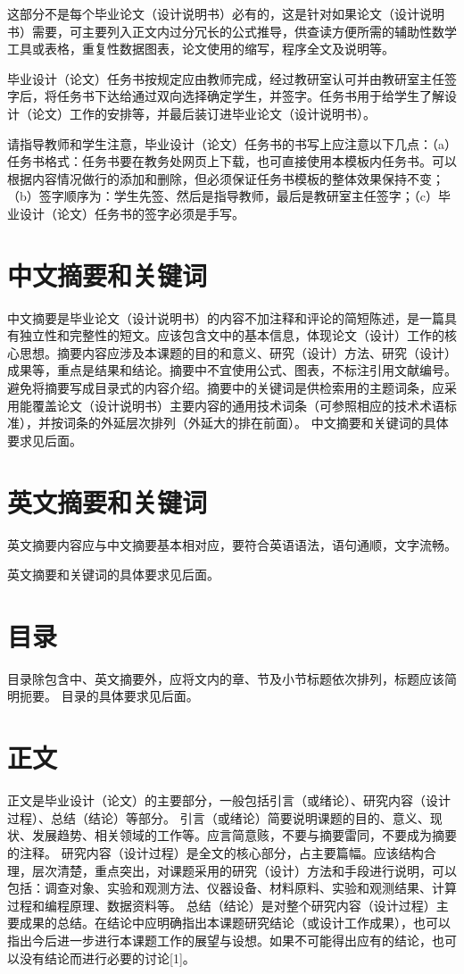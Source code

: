 这部分不是每个毕业论文（设计说明书）必有的，这是针对如果论文（设计说明书）需要，可主要列入正文内过分冗长的公式推导，供查读方便所需的辅助性数学工具或表格，重复性数据图表，论文使用的缩写，程序全文及说明等。

毕业设计（论文）任务书按规定应由教师完成，经过教研室认可并由教研室主任签字后，将任务书下达给通过双向选择确定学生，并签字。任务书用于给学生了解设计（论文）工作的安排等，并最后装订进毕业论文（设计说明书）。

请指导教师和学生注意，毕业设计（论文）任务书的书写上应注意以下几点：（a）任务书格式：任务书要在教务处网页上下载，也可直接使用本模板内任务书。可以根据内容情况做行的添加和删除，但必须保证任务书模板的整体效果保持不变；（b）签字顺序为：学生先签、然后是指导教师，最后是教研室主任签字；（c）毕业设计（论文）任务书的签字必须是手写。

\section{中文摘要和关键词}

中文摘要是毕业论文（设计说明书）的内容不加注释和评论的简短陈述，是一篇具有独立性和完整性的短文。应该包含文中的基本信息，体现论文（设计）工作的核心思想。摘要内容应涉及本课题的目的和意义、研究（设计）方法、研究（设计）成果等，重点是结果和结论。摘要中不宜使用公式、图表，不标注引用文献编号。避免将摘要写成目录式的内容介绍。摘要中的关键词是供检索用的主题词条，应采用能覆盖论文（设计说明书）主要内容的通用技术词条（可参照相应的技术术语标准），并按词条的外延层次排列（外延大的排在前面）。
中文摘要和关键词的具体要求见后面。

\section{英文摘要和关键词} 

英文摘要内容应与中文摘要基本相对应，要符合英语语法，语句通顺，文字流畅。

英文摘要和关键词的具体要求见后面。

\section{目录}
目录除包含中、英文摘要外，应将文内的章、节及小节标题依次排列，标题应该简明扼要。
目录的具体要求见后面。
\section{正文}
正文是毕业设计（论文）的主要部分，一般包括引言（或绪论）、研究内容（设计过程）、总结（结论）等部分。
引言（或绪论）简要说明课题的目的、意义、现状、发展趋势、相关领域的工作等。应言简意赅，不要与摘要雷同，不要成为摘要的注释。
研究内容（设计过程）是全文的核心部分，占主要篇幅。应该结构合理，层次清楚，重点突出，对课题采用的研究（设计）方法和手段进行说明，可以包括：调查对象、实验和观测方法、仪器设备、材料原料、实验和观测结果、计算过程和编程原理、数据资料等。
总结（结论）是对整个研究内容（设计过程）主要成果的总结。在结论中应明确指出本课题研究结论（或设计工作成果），也可以指出今后进一步进行本课题工作的展望与设想。如果不可能得出应有的结论，也可以没有结论而进行必要的讨论[1]。
